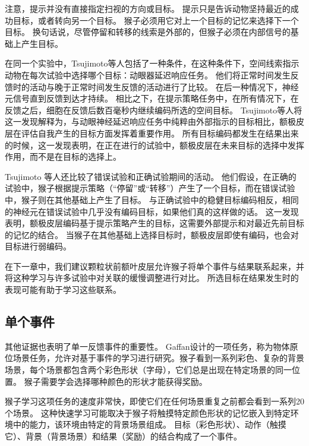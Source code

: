 注意，提示并没有直接指定扫视的方向或目标。
提示只是告诉动物坚持最近的成功目标，或者转向另一个目标。
猴子必须用它对上一个目标的记忆来选择下一个目标。
换句话说，尽管停留和转移的线索是外部的，但猴子必须在内部信号的基础上产生目标。\par


在同一个实验中，Tsujimoto等人包括了一种条件，在这种条件下，空间线索指示动物在每次试验中选择哪个目标：动眼器延迟响应任务。
他们将正常时间发生反馈时的活动与晚于正常时间发生反馈的活动进行了比较。
在后一种情况下，神经元信号直到反馈到达才持续。
相比之下，在提示策略任务中，在所有情况下，在反馈之后，细胞在反馈后数百毫秒内继续编码所选的空间目标。
Tsujimoto等人将这一发现解释为，与动眼神经延迟响应任务中纯粹由外部指示的目标相比，额极皮层在评估自我产生的目标方面发挥着重要作用。
所有目标编码都发生在结果出来的时候，这一发现表明，在正在进行的试验中，额极皮层在未来目标的选择中发挥作用，而不是在目标的选择上。\par


Tsujimoto 等人还比较了错误试验和正确试验期间的活动。
他们假设，在正确的试验中，猴子根据提示策略（“停留”或“转移”）产生了一个目标，而在错误试验中，猴子则在其他基础上产生了目标。
与正确试验中的稳健目标编码相反，相同的神经元在错误试验中几乎没有编码目标，如果他们真的这样做的话。
这一发现表明，额极皮层编码基于提示策略产生的目标，这需要外部提示和对最近先前目标的记忆的结合。
当猴子在其他基础上选择目标时，额极皮层即使有编码，也会对目标进行弱编码。\par


在下一章中，我们建议颗粒状前额叶皮层允许猴子将单个事件与结果联系起来，并将这种学习与许多试验中对关联的缓慢调整进行对比。
所选目标在结果发生时的表现可能有助于学习这些联系。\par



\subsection{单个事件}

其他证据也表明了单一反馈事件的重要性。
Gaffan\cite{gaffan1992amnesia}设计的一项任务，称为物体原位场景任务，允许对基于事件的学习进行研究。猴子看到一系列彩色、复杂的背景场景，每个场景都包含两个彩色形状（字母），它们总是出现在特定场景的同一位置。
猴子需要学会选择哪种颜色的形状才能获得奖励。\par


猴子学习这项任务的速度非常快，即使它们在任何场景重复之前都会看到一系列20个场景。
这种快速学习可能取决于猴子将触摸特定颜色形状的记忆嵌入到特定环境中的能力，该环境由特定的背景场景组成。
目标（彩色形状）、动作（触摸它）、背景（背景场景）和结果（奖励）的结合构成了一个事件。\par


